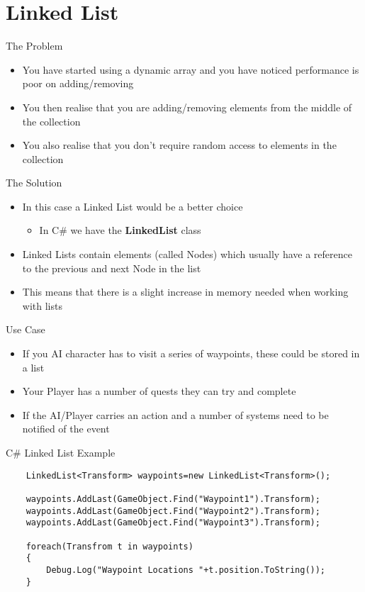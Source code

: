 \part{Linked List}
\frame{\partpage}

\begin{frame}{The Problem}
	\begin{itemize}
		\pause \item You have started using a dynamic array and you have noticed performance is poor on adding/removing
		 \pause \item You then realise that you are adding/removing elements from the middle of the collection
		 \pause \item You also realise that you don't require random access to elements in the collection
	\end{itemize}
\end{frame}

\begin{frame}{The Solution}
	\begin{itemize}
		\pause \item In this case a Linked List would be a better choice
		\begin{itemize}
			\pause \item In C\# we have the \textbf{LinkedList} class
		\end{itemize}
		\pause \item Linked Lists contain elements (called Nodes) which usually have a reference to the previous and next Node in the list
		\pause \item This means that there is a slight increase in memory needed when working with lists
	\end{itemize}
\end{frame}

\begin{frame}{Use Case}
	\begin{itemize}
		\pause \item If you AI character has to visit a series of waypoints, these could be stored in a list
		\pause \item Your Player has a number of quests they can try and complete
		\pause \item If the AI/Player carries an action and a number of systems need to be notified of the event 
	\end{itemize}
\end{frame}

\begin{frame}[fragile]{C\# Linked List
Example}
\begin{lstlisting}
	LinkedList<Transform> waypoints=new LinkedList<Transform>();
	
	waypoints.AddLast(GameObject.Find("Waypoint1").Transform);
	waypoints.AddLast(GameObject.Find("Waypoint2").Transform);
	waypoints.AddLast(GameObject.Find("Waypoint3").Transform);
	
	foreach(Transfrom t in waypoints)
	{
		Debug.Log("Waypoint Locations "+t.position.ToString());
	}
\end{lstlisting}
\end{frame}

